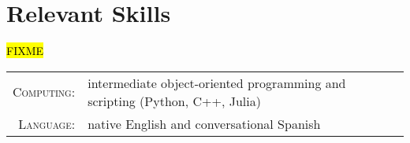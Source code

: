 \section{Relevant Skills}

\hl{FIXME}

\begin{tabularx}{\textwidth}{r I}










  \textsc{Computing:} & intermediate object-oriented programming and scripting (Python, C++, Julia) \\

  \hline \hline \hline {}

  \textsc{Language:} & native English and conversational Spanish \\

\end{tabularx}